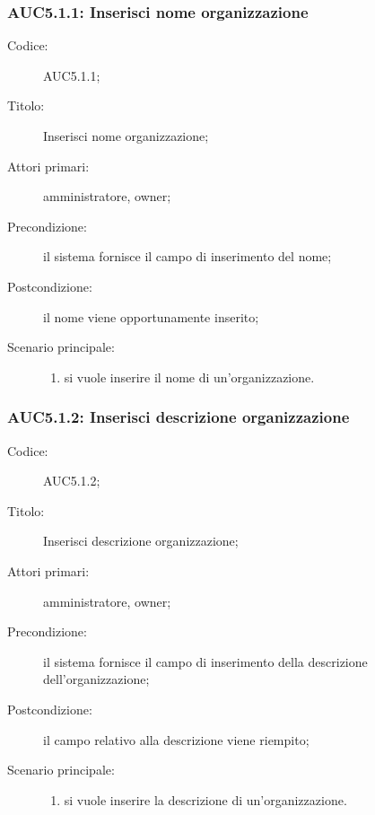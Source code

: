 \documentclass[../../../analisi-dei-requisiti.tex]{subfiles}
\begin{document}
\subsubsection{AUC5.1.1: Inserisci nome organizzazione}%
\label{subs:AUC5.1.1}
\begin{description}
  \item[Codice:] AUC5.1.1;
  \item[Titolo:] Inserisci nome organizzazione;
  \item[Attori primari:] amministratore, owner;
  \item[Precondizione:] il sistema fornisce il campo di inserimento del nome;
  \item[Postcondizione:] il nome viene opportunamente inserito;
  \item[Scenario principale:]
        \begin{enumerate}
          \item si vuole inserire il nome di un'organizzazione.
        \end{enumerate}

\end{description}

\subsubsection{AUC5.1.2: Inserisci descrizione organizzazione}%
\label{subs:AUC5.1.2}
\begin{description}
  \item[Codice:] AUC5.1.2;
  \item[Titolo:] Inserisci descrizione organizzazione;
  \item[Attori primari:] amministratore, owner;
  \item[Precondizione:] il sistema fornisce il campo di inserimento della descrizione dell'organizzazione;
  \item[Postcondizione:] il campo relativo alla descrizione viene riempito;
  \item[Scenario principale:]
        \begin{enumerate}
          \item si vuole inserire la descrizione di un'organizzazione.
        \end{enumerate}
\end{description}
\end{document}

